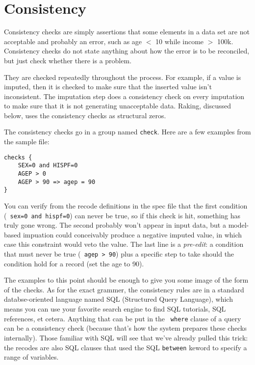 \documentclass{article}
\begin{document}
\section{Consistency}
Consistency checks are simply assertions that some elements in a data set are
not acceptable and probably an error, such as age $<$ 10 while income $>$ 100k. 
Consistency checks do not state anything about how the error is to be
reconciled, but just check whether there is a problem.

They are checked repeatedly throughout the process. For example, if a value is
imputed, then it is checked to make sure that the inserted value isn't
inconsistent.  The imputation step does a consistency check on
every imputation to make sure that it is not generating unacceptable
data. Raking, discussed below, uses the consistency checks as structural
zeros. 

The consistency checks go in a group named {\tt check}. Here are a few examples from the 
sample file:

\begin{specbit} 
\begin{verbatim}
checks {
    SEX=0 and HISPF=0
    AGEP > 0 
    AGEP > 90 => agep = 90
}
\end{verbatim}
\end{specbit} 

You can verify from the recode definitions in the spec file that the first condition ({\tt
sex=0 and hispf=0}) can never be true, so if this check is hit, something has truly gone
wrong. The second probably won't appear in input data, but a model-based impuation could
conceivably produce a negative imputed value, in which case this constraint would veto the
value. The last line is a {\em pre-edit}: a condition that must never be true ({\tt
agep > 90}) plus a specific step to take should the condition hold for a record (set
the age to 90).


The examples to this point should be enough to give you some image of the form of the
checks. As for the exact grammer,
the consistency rules are in a standard databse-oriented language named SQL (Structured Query
Language), which means you can use your favorite search engine to find SQL
tutorials, SQL references, et cetera. Anything that can be put in the {\tt
where} clause of a query can be a consistency check (because that's how the
system prepares these checks internally). Those familiar with SQL will see that
we've already pulled this trick: the recodes are also SQL clauses that used the
SQL {\tt between} keword to specify a range of variables.
\end{document}
